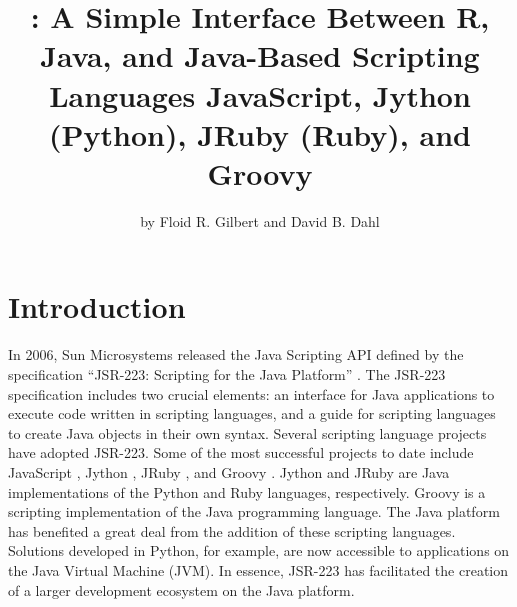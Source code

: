 \title{: A Simple Interface Between R, Java, and Java-Based Scripting Languages JavaScript, Jython (Python), JRuby (Ruby), and Groovy}
\author{by Floid R. Gilbert and David B. Dahl}

\newcommand{\mytilde}{\lower.6ex\hbox{\char`\~}}

\maketitle


\section{Introduction}

In 2006, Sun Microsystems released the Java Scripting API \citep{jsa} defined by the specification “JSR-223: Scripting for the Java Platform” \citep{jsr223spec}. The JSR-223 specification includes two crucial elements: an interface for Java applications to execute code written in scripting languages, and a guide for scripting languages to create Java objects in their own syntax. Several scripting language projects have adopted JSR-223. Some of the most successful projects to date include JavaScript \citep{jsnashorn}, Jython \citep{jython}, JRuby \citep{jruby}, and Groovy \citep{groovy}. Jython and JRuby are Java implementations of the Python \citep{python} and Ruby \citep{ruby} languages, respectively. Groovy is a scripting implementation of the Java programming language. The Java platform has benefited a great deal from the addition of these scripting languages. Solutions developed in Python, for example, are now accessible to applications on the Java Virtual Machine (JVM). In essence, JSR-223 has facilitated the creation of a larger development ecosystem on the Java platform.

